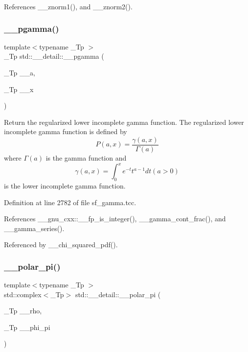 References \+\_\+\+\_\+znorm1(), and \+\_\+\+\_\+znorm2().

\mbox{\label{namespacestd_1_1____detail_a009273f90a2496eb24abf92cd957b851}} 
\subsubsection{\texorpdfstring{\+\_\+\+\_\+pgamma()}{\_\_pgamma()}}
{\footnotesize\ttfamily template$<$typename \+\_\+\+Tp $>$ \\
\+\_\+\+Tp std\+::\+\_\+\+\_\+detail\+::\+\_\+\+\_\+pgamma (\begin{DoxyParamCaption}\item[{\+\_\+\+Tp}]{\+\_\+\+\_\+a,  }\item[{\+\_\+\+Tp}]{\+\_\+\+\_\+x }\end{DoxyParamCaption})}



Return the regularized lower incomplete gamma function. The regularized lower incomplete gamma function is defined by \[ P(a,x) = \frac{\gamma(a,x)}{\Gamma(a)} \] where $ \Gamma(a) $ is the gamma function and \[ \gamma(a,x) = \int_0^x e^{-t}t^{a-1}dt (a > 0) \] is the lower incomplete gamma function. 



Definition at line 2782 of file sf\+\_\+gamma.\+tcc.



References \+\_\+\+\_\+gnu\+\_\+cxx\+::\+\_\+\+\_\+fp\+\_\+is\+\_\+integer(), \+\_\+\+\_\+gamma\+\_\+cont\+\_\+frac(), and \+\_\+\+\_\+gamma\+\_\+series().



Referenced by \+\_\+\+\_\+chi\+\_\+squared\+\_\+pdf().

\mbox{\label{namespacestd_1_1____detail_ac69e259ad511fcc7a54c6ec315adcfa4}} 
\subsubsection{\texorpdfstring{\+\_\+\+\_\+polar\+\_\+pi()}{\_\_polar\_pi()}\hspace{0.1cm}{\footnotesize\ttfamily [1/2]}}
{\footnotesize\ttfamily template$<$typename \+\_\+\+Tp $>$ \\
std\+::complex$<$\+\_\+\+Tp$>$ std\+::\+\_\+\+\_\+detail\+::\+\_\+\+\_\+polar\+\_\+pi (\begin{DoxyParamCaption}\item[{\+\_\+\+Tp}]{\+\_\+\+\_\+rho,  }\item[{\+\_\+\+Tp}]{\+\_\+\+\_\+phi\+\_\+pi }\end{DoxyParamCaption})\hspace{0.3cm}{\ttfamily [inline]}}

